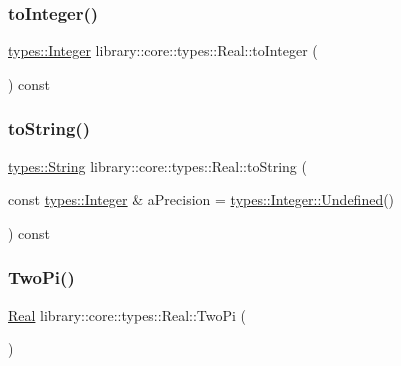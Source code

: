 \mbox{\label{classlibrary_1_1core_1_1types_1_1_real_aa4a7f3663994b5e59dc894b80856e0fb}} 
\subsubsection{\texorpdfstring{toInteger()}{toInteger()}}
{\footnotesize\ttfamily \mbox{\hyperlink{classlibrary_1_1core_1_1types_1_1_integer}{types\+::\+Integer}} library\+::core\+::types\+::\+Real\+::to\+Integer (\begin{DoxyParamCaption}{ }\end{DoxyParamCaption}) const}

\mbox{\label{classlibrary_1_1core_1_1types_1_1_real_a5d2632591e723b672323c60f1f4ec0be}} 
\subsubsection{\texorpdfstring{toString()}{toString()}}
{\footnotesize\ttfamily \mbox{\hyperlink{classlibrary_1_1core_1_1types_1_1_string}{types\+::\+String}} library\+::core\+::types\+::\+Real\+::to\+String (\begin{DoxyParamCaption}\item[{const \mbox{\hyperlink{classlibrary_1_1core_1_1types_1_1_integer}{types\+::\+Integer}} \&}]{a\+Precision = {\ttfamily \mbox{\hyperlink{classlibrary_1_1core_1_1types_1_1_integer_a142c2df49031b787daf30673c73fcad7}{types\+::\+Integer\+::\+Undefined}}()} }\end{DoxyParamCaption}) const}

\mbox{\label{classlibrary_1_1core_1_1types_1_1_real_ab6da87777d2c1c3517b3ee0c1b87f8a7}} 
\subsubsection{\texorpdfstring{TwoPi()}{TwoPi()}}
{\footnotesize\ttfamily \mbox{\hyperlink{classlibrary_1_1core_1_1types_1_1_real}{Real}} library\+::core\+::types\+::\+Real\+::\+Two\+Pi (\begin{DoxyParamCaption}{ }\end{DoxyParamCaption})\hspace{0.3cm}{\ttfamily [static]}}

